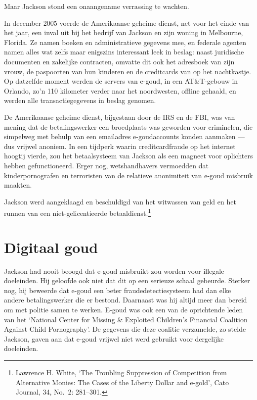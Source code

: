 \documentclass[
  a5paper,
  smalldemyvopaper,11pt,twoside,onecolumn,openright,extrafontsizes]{memoir}
\begin{document}
Maar Jackson stond een onaangename verrassing te wachten.

In december 2005 voerde de Amerikaanse geheime dienst, net voor het
einde van het jaar, een inval uit bij het bedrijf van Jackson en zijn
woning in Melbourne, Florida. Ze namen boeken en administratieve
gegevens mee, en federale agenten namen alles wat zelfs maar enigszins
interessant leek in beslag: naast juridische documenten en zakelijke
contracten, omvatte dit ook het adresboek van zijn vrouw, de paspoorten
van hun kinderen en de creditcards van op het nachtkastje. Op datzelfde
moment werden de servers van e-goud, in een AT\&T-gebouw in Orlando,
zo'n 110 kilometer verder naar het noordwesten, offline gehaald, en
werden alle transactiegegevens in beslag genomen.

De Amerikaanse geheime dienst, bijgestaan door de IRS en de FBI, was van
mening dat de betalingswerker een broedplaats was geworden voor
criminelen, die simpelweg met behulp van een emailadres e-goudaccounts
konden aanmaken --- dus vrijwel anoniem. In een tijdperk waarin
creditcardfraude op het internet hoogtij vierde, zou het betaalsysteem
van Jackson als een magneet voor oplichters hebben gefunctioneerd. Erger
nog, wetshandhavers vermoedden dat kinderpornografen en terroristen van
de relatieve anonimiteit van e-goud misbruik maakten.

Jackson werd aangeklaagd en beschuldigd van het witwassen van geld en
het runnen van een niet-gelicentieerde betaaldienst.\footnote{\hspace{0pt}Lawrence
  H. White, `The Troubling Suppression of Competition from Alternative
  Monies: The Cases of the Liberty Dollar and e-gold', Cato Journal, 34,
  No.~2: 281--301.}

\section*{Digitaal goud}\label{digitaal-goud}


Jackson had nooit beoogd dat e-goud misbruikt zou worden voor illegale
doeleinden. Hij geloofde ook niet dat dit op een serieuze schaal
gebeurde. Sterker nog, hij beweerde dat e-goud een beter
fraudedetectiesysteem had dan elke andere betalingswerker die er
bestond. Daarnaast was hij altijd meer dan bereid om met politie samen
te werken. E-goud was ook een van de oprichtende leden van het `National
Center for Missing \& Exploited Children's Financial Coalition Against
Child Pornography'. De gegevens die deze coalitie verzamelde, zo stelde
Jackson, gaven aan dat e-goud vrijwel niet werd gebruikt voor dergelijke
doeleinden.
\end{document}
